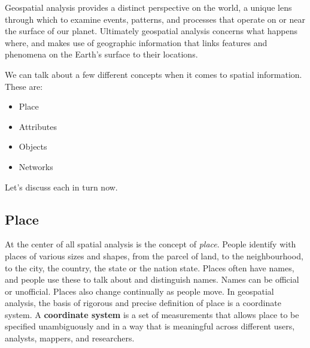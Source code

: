 \documentclass[
  krantz2]{krantz}
\providecommand{\tightlist}{%
  \setlength{\itemsep}{0pt}\setlength{\parskip}{0pt}}
\begin{document}
Geospatial analysis provides a distinct perspective on the world, a unique lens through which to examine events, patterns, and processes that operate on or near the surface of our planet. Ultimately geospatial analysis concerns what happens where, and makes use of geographic information that links features and phenomena on the Earth's surface to their locations.

We can talk about a few different concepts when it comes to spatial information. These are:

\begin{itemize}
\tightlist
\item
  Place
\item
  Attributes
\item
  Objects
\item
  Networks
\end{itemize}

Let's discuss each in turn now.

\hypertarget{place}{%
\subsection{Place}\label{place}}

At the center of all spatial analysis is the concept of \emph{place}. People identify with places of various sizes and shapes, from the parcel of land, to the neighbourhood, to the city, the country, the state or the nation state. Places often have names, and people use these to talk about and distinguish names. Names can be official or unofficial. Places also change continually as people move. In geospatial analysis, the basis of rigorous and precise definition of place is a coordinate system. A \textbf{coordinate system} is a set of measurements that allows place to be specified unambiguously and in a way that is meaningful across different users, analysts, mappers, and researchers.
\end{document}
